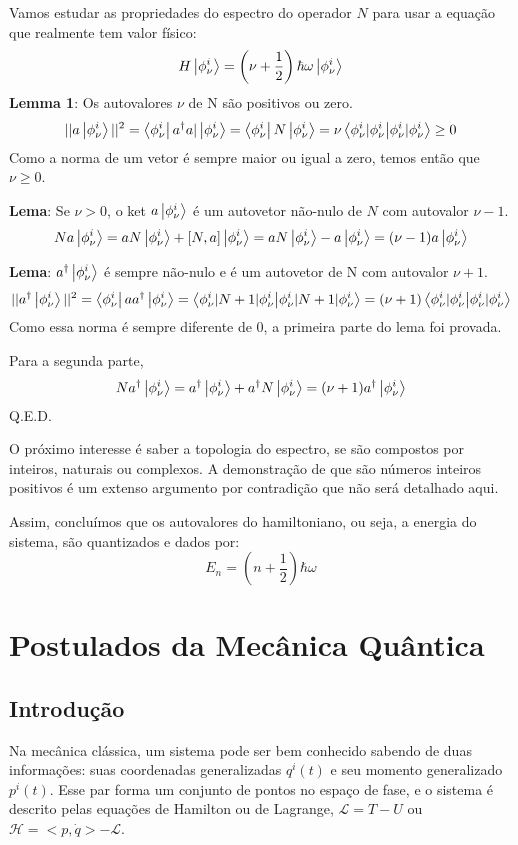 \documentclass{article}
\begin{document}
	Vamos estudar as propriedades do espectro do operador $N$ para usar a equação que realmente tem valor físico:
	$$H\ket{\phi^{i}_{\nu}} =\left( \nu +\frac{1}{2} \right)\hbar \omega \ket{\phi^{i}_{\nu}} $$
	\textbf{Lemma 1}: Os autovalores $\nu$ de N são positivos ou zero.
	$$||a\ket{\phi^{i}_{\nu}}||^{2}=\bra{\phi^{i}_{\nu}}a^{\dagger}a|\ket{\phi^{i}_{\nu}}=\bra{\phi^{i}_{\nu}}N\ket{\phi^{i}_{\nu}}=\nu\braket{\phi^{i}_{\nu}|\phi^{i}_{\nu}}\geq 0    $$
	Como a norma de um vetor é sempre maior ou igual a zero, temos então que $\nu \geq 0$.
	
	\textbf{Lema}: Se $\nu>0$, o ket $a\ket{\phi^{i}_{\nu}}$ é um autovetor não-nulo de $N$ com autovalor $\nu-1$.
	$$Na\ket{\phi^{i}_{\nu}}=aN\ket{\phi^{i}_{\nu}}+\left[ N,a \right]\ket{\phi^{i}_{\nu}} =aN\ket{\phi^{i}_{\nu}}-a\ket{\phi^{i}_{\nu}}=(\nu-1)a\ket{\phi^{i}_{\nu}}      $$
	
	\textbf{Lema}: $a^{\dagger}\ket{\phi^{i}_{\nu}}$ é sempre não-nulo e é um autovetor de N com autovalor $\nu+1$.
	$$||a^{\dagger}\ket{\phi^{i}_{\nu}}||^{2}=\bra{\phi^{i}_{\nu}}aa^{\dagger}\ket{\phi^{i}_{\nu}}=\braket{ \phi^{i}_{\nu} |N+1|\phi^{i}_{\nu}  }=(\nu+1)\braket{ \phi^{i}_{\nu} | \phi^{i}_{\nu} }       $$
	Como essa norma é sempre diferente de 0, a primeira parte do lema foi provada.
	
	Para a segunda parte,
	$$Na^{\dagger}\ket{\phi^{i}_{\nu}}=a^{\dagger}\ket{\phi^{i}_{\nu}}+a^{\dagger}N\ket{\phi^{i}_{\nu}}=(\nu+1)a^{\dagger}\ket{\phi^{i}_{\nu}}    $$
	Q.E.D.
	
	O próximo interesse é saber a topologia do espectro, se são compostos por inteiros, naturais ou complexos. A demonstração de que são números inteiros positivos é um extenso argumento por contradição que não será detalhado aqui.
	
	Assim, concluímos que os autovalores do hamiltoniano, ou seja, a energia do sistema, são quantizados e dados por:
	$$E_{n}=\left( n+\frac{1}{2} \right)\hbar \omega$$
	
	\section{Postulados da Mecânica Quântica}
	
	\subsection{Introdução}
	Na mecânica clássica, um sistema pode ser bem conhecido sabendo de duas informações: suas coordenadas generalizadas $q^{i}(t)$ e seu momento generalizado $p^{i}(t)$. Esse par forma um conjunto de pontos no espaço de fase, e o sistema é descrito pelas equações de Hamilton ou de Lagrange, $\mathcal{L}=T-U$ ou $\mathcal{H}=<p, \dot{q}>-\mathcal{L}$.
	
\end{document}
